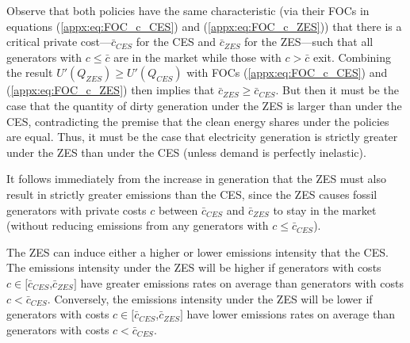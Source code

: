 \documentclass[12pt]{article}
\begin{document}
Observe that both policies have the same characteristic (via their FOCs in equations (\ref{appx:eq:FOC_c_CES}) and (\ref{appx:eq:FOC_c_ZES})) that there is a critical private cost---$\bar{c}_{CES}$ for the CES and $\bar{c}_{ZES}$ for the ZES---such that all generators with $c\leq\bar{c}$ are in the market while those with $c>\bar{c}$ exit. Combining the result $U'(Q_{ZES})\geq U'(Q_{CES})$ with FOCs (\ref{appx:eq:FOC_c_CES}) and (\ref{appx:eq:FOC_c_ZES}) then implies that $\bar{c}_{ZES}\geq\bar{c}_{CES}$. But then it must be the case that the quantity of dirty generation under the ZES is larger than under the CES, contradicting the premise that the clean energy shares under the policies are equal. Thus, it must be the case that electricity generation is strictly greater under the ZES than under the CES (unless demand is perfectly inelastic).

It follows immediately from the increase in generation that the ZES must also result in strictly greater emissions than the CES, since the ZES causes fossil generators with private costs $c$ between $\bar{c}_{CES}$ and $\bar{c}_{ZES}$ to stay in the market (without reducing emissions from any generators with $c\leq\bar{c}_{CES}$).

The ZES can induce either a higher or lower emissions intensity that the CES. The emissions intensity under the ZES will be higher if generators with costs $c\in[\bar{c}_{CES}$,$\bar{c}_{ZES}]$ have greater emissions rates on average than generators with costs $c<\bar{c}_{CES}$. Conversely, the emissions intensity under the ZES will be lower if generators with costs $c\in[\bar{c}_{CES}$,$\bar{c}_{ZES}]$ have lower emissions rates on average than generators with costs $c<\bar{c}_{CES}$.
\end{document}
